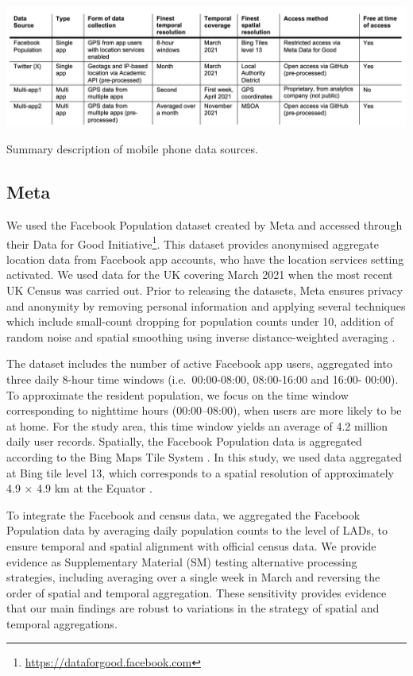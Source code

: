 \documentclass[]{rsos}%
\begin{document}
\begin{table}[h]
\centering
\includegraphics[width=1\linewidth]{figures/table-data-source.png}
\caption{Summary description of mobile phone data sources.}
\label{tab:data-source}
\end{table}

\subsection{Meta}\label{meta}

We used the Facebook Population dataset created by Meta and accessed
through their Data for Good Initiative\footnote{\url{https://dataforgood.facebook.com}}. This dataset provides
anonymised aggregate location data from Facebook app accounts, who have
the location services setting activated.
We used data for the UK covering March 2021 when the most recent UK
Census was carried out. Prior to releasing the datasets, Meta ensures
privacy and anonymity by removing personal information and applying
several techniques which include small-count dropping for population
counts under 10, addition of random noise and spatial smoothing using
inverse distance-weighted averaging \citep{maas2019}.

The dataset includes the number of active Facebook app users, aggregated
into three daily 8-hour time windows (i.e.~00:00-08:00, 08:00-16:00 and
16:00- 00:00). To approximate the resident population, we focus on the
time window corresponding to nighttime hours (00:00--08:00), when users
are more likely to be at home. For the study area, this time window
yields an average of 4.2 million daily user records. Spatially, the
Facebook Population data is aggregated according to the Bing Maps Tile
System \citep{bingmaps_tile_system}. In this study, we used data aggregated
at Bing tile level 13, which corresponds to a spatial resolution of
approximately 4.9 \(\times\) 4.9 km at the Equator \citep{maas2019}.

To integrate the Facebook and census data, we aggregated the Facebook
Population data by averaging daily population counts to the level of
LADs, to ensure temporal and spatial alignment with official census
data. We provide evidence as Supplementary Material (SM) testing
alternative processing strategies, including averaging over a single
week in March and reversing the order of spatial and temporal
aggregation. These sensitivity provides evidence that our main findings
are robust to variations in the strategy of spatial and temporal
aggregations.
\end{document}
